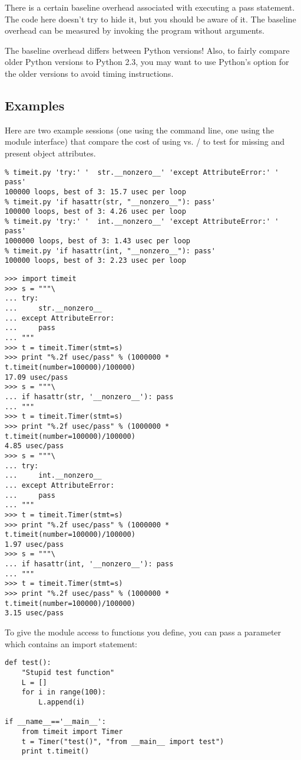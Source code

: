 \begin{notice}
  There is a certain baseline overhead associated with executing a
  pass statement.  The code here doesn't try to hide it, but you
  should be aware of it.  The baseline overhead can be measured by
  invoking the program without arguments.
\end{notice}

The baseline overhead differs between Python versions!  Also, to
fairly compare older Python versions to Python 2.3, you may want to
use Python's  option for the older versions to avoid
timing  instructions.

\subsection{Examples}

Here are two example sessions (one using the command line, one using
the module interface) that compare the cost of using
 vs. / to test for
missing and present object attributes.

\begin{verbatim}
% timeit.py 'try:' '  str.__nonzero__' 'except AttributeError:' '  pass'
100000 loops, best of 3: 15.7 usec per loop
% timeit.py 'if hasattr(str, "__nonzero__"): pass'
100000 loops, best of 3: 4.26 usec per loop
% timeit.py 'try:' '  int.__nonzero__' 'except AttributeError:' '  pass'
1000000 loops, best of 3: 1.43 usec per loop
% timeit.py 'if hasattr(int, "__nonzero__"): pass'
100000 loops, best of 3: 2.23 usec per loop
\end{verbatim}

\begin{verbatim}
>>> import timeit
>>> s = """\
... try:
...     str.__nonzero__
... except AttributeError:
...     pass
... """
>>> t = timeit.Timer(stmt=s)
>>> print "%.2f usec/pass" % (1000000 * t.timeit(number=100000)/100000)
17.09 usec/pass
>>> s = """\
... if hasattr(str, '__nonzero__'): pass
... """
>>> t = timeit.Timer(stmt=s)
>>> print "%.2f usec/pass" % (1000000 * t.timeit(number=100000)/100000)
4.85 usec/pass
>>> s = """\
... try:
...     int.__nonzero__
... except AttributeError:
...     pass
... """
>>> t = timeit.Timer(stmt=s)
>>> print "%.2f usec/pass" % (1000000 * t.timeit(number=100000)/100000)
1.97 usec/pass
>>> s = """\
... if hasattr(int, '__nonzero__'): pass
... """
>>> t = timeit.Timer(stmt=s)
>>> print "%.2f usec/pass" % (1000000 * t.timeit(number=100000)/100000)
3.15 usec/pass
\end{verbatim}

To give the \module{timeit} module access to functions you
define, you can pass a  parameter which contains an import
statement:

\begin{verbatim}
def test():
    "Stupid test function"
    L = []
    for i in range(100):
        L.append(i)

if __name__=='__main__':
    from timeit import Timer
    t = Timer("test()", "from __main__ import test")
    print t.timeit()
\end{verbatim}
